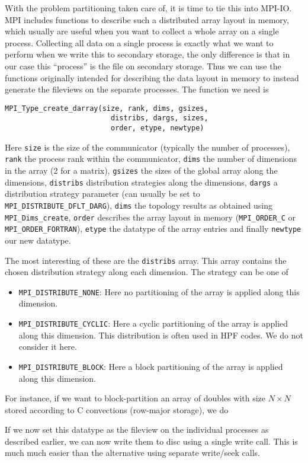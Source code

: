 With the problem partitioning taken care of, it is time to tie this into MPI-IO.
MPI includes functions to describe such a distributed array layout in memory,
which usually are useful when you want to collect a whole array on a single
process. Collecting all data on a single process is exactly what we want to
perform when we write this to secondary storage, the only difference is that in
our case this ``process'' is the file on secondary storage. Thus we can use the
functions originally intended for describing the data layout in memory to
instead generate the fileviews on the separate processes. The function we need
is
\begin{lstlisting}[style=c]
  MPI_Type_create_darray(size, rank, dims, gsizes,
                         distribs, dargs, sizes,
                         order, etype, newtype)
\end{lstlisting}
Here \texttt{size} is the size of the communicator (typically the number of
processes), \texttt{rank} the process rank within the communicator,
\texttt{dims} the number of dimensions in the array (2 for a matrix),
\texttt{gsizes} the sizes of the global array along the dimensions,
\texttt{distribs} distribution strategies along the dimensions, \texttt{dargs} a
distribution strategy parameter (can usually be set to
\texttt{MPI\_DISTRIBUTE\_DFLT\_DARG}), \texttt{dims} the topology results as
obtained using \texttt{MPI\_Dims\_create}, \texttt{order} describes the array
layout in memory (\texttt{MPI\_ORDER\_C} or \texttt{MPI\_ORDER\_FORTRAN}),
\texttt{etype} the datatype of the array entries and finally \texttt{newtype}
our new datatype.

The most interesting of these are the \texttt{distribs} array. This array
contains the chosen distribution strategy along each dimension. The strategy can
be one of
\begin{itemize}
\item \texttt{MPI\_DISTRIBUTE\_NONE}: Here no partitioning of the array is applied along
  this dimension.
\item \texttt{MPI\_DISTRIBUTE\_CYCLIC}: Here a cyclic partitioning of the array is applied
  along this dimension. This distribution is often used in HPF codes. We do not
  consider it here.
\item \texttt{MPI\_DISTRIBUTE\_BLOCK}: Here a block partitioning of the array is applied
  along this dimension.
\end{itemize}
For instance, if we want to block-partition an array of doubles with size
$N\times N$ stored according to C convections (row-major storage), we do

If we now set this datatype as the fileview on the individual processes as
described earlier, we can now write them to disc using a single write call. This
is much much easier than the alternative using separate write/seek calls.

